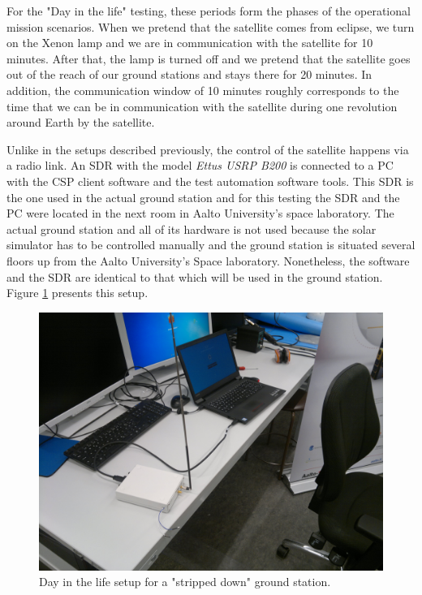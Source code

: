 \documentclass[english,12pt,a4paper,pdftex,elec,utf8]{aaltothesis}
\begin{document}
For the "Day in the life" testing, these periods form the phases of the operational mission scenarios. When we pretend that the satellite comes from eclipse, we turn on the Xenon lamp and we are in communication with the satellite for 10 minutes. After that, the lamp is turned off and we pretend that the satellite goes out of the reach of our ground stations and stays there for 20 minutes. In addition, the communication window of 10 minutes roughly corresponds to the time that we can be in communication with the satellite during one revolution around Earth by the satellite.\par 
Unlike in the setups described previously, the control of the satellite happens via a radio link. An SDR with the model \textit{Ettus USRP B200} is connected to a PC with the CSP client software and the test automation software tools. This SDR is the one used in the actual ground station and for this testing the SDR and the PC were located in the next room in Aalto University's space laboratory. The actual ground station and all of its hardware is not used because the solar simulator has to be controlled manually and the ground station is situated several floors up from the Aalto University's Space laboratory. Nonetheless, the software and the SDR are identical to that which will be used in the ground station. 
Figure \ref{dayinlifelink} presents this setup.\par
\begin{figure}[h!]
\centering
\includegraphics[scale=0.3]{daysetuplink}
\caption{Day in the life setup for a "stripped down" ground station.}
\label{dayinlifelink}
\end{figure} 
\clearpage
\end{document}
